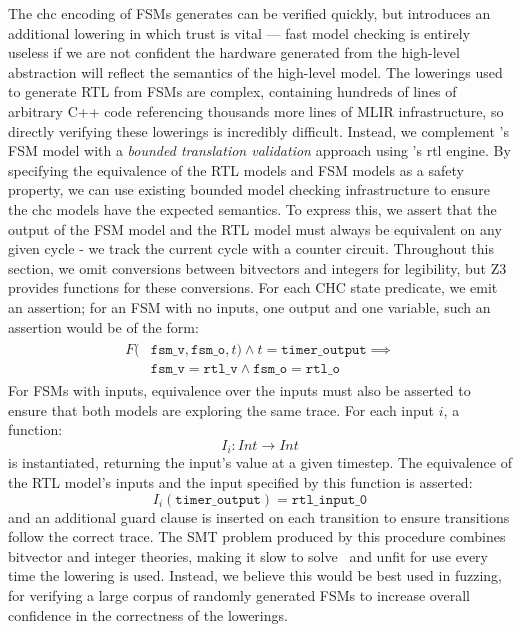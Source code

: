 \documentclass[acmsmall,screen,review]{acmart}
\begin{document}
The \ac{chc} encoding of FSMs \toolname{} generates can be verified quickly, but introduces an additional lowering in which trust is vital --- fast model checking is entirely useless if we are not confident the hardware generated from the high-level abstraction will reflect the semantics of the high-level model.
The lowerings used to generate RTL from FSMs are complex, containing hundreds of lines of arbitrary C++ code referencing thousands more lines of MLIR infrastructure, so directly verifying these lowerings is incredibly difficult.
Instead, we complement \toolname{}'s FSM model with a \textit{bounded translation validation} approach using \toolname{}'s \ac{rtl} engine.
By specifying the equivalence of the RTL models and FSM models as a safety property, we can use existing bounded model checking infrastructure to ensure the \ac{chc} models have the expected semantics.
To express this, we assert that the output of the FSM model and the RTL model must always be equivalent on any given cycle - we track the current cycle with a counter circuit.
Throughout this section, we omit conversions between bitvectors and integers for legibility, but Z3 provides functions for these conversions.
For each CHC state predicate, we emit an assertion; for an FSM with no inputs, one output and one variable, such an assertion would be of the form:
\begin{align}
\begin{split}
F(&\texttt{fsm\_v}, \texttt{fsm\_o}, t) \land t = \texttt{timer\_output} \implies \\
&\texttt{fsm\_v} = \texttt{rtl\_v} \land \texttt{fsm\_o} = \texttt{rtl\_o}
\end{split}    
\end{align}
For FSMs with inputs, equivalence over the inputs must also be asserted to ensure that both models are exploring the same trace.
For each input $i$, a function:
\begin{equation}
  I_i : Int \rightarrow Int
\end{equation}    
is instantiated, returning the input's value at a given timestep.
The equivalence of the RTL model's inputs and the input specified by this function is asserted:
\begin{equation}
  I_i(\texttt{timer\_output}) = \texttt{rtl\_input\_0} 
\end{equation}    
and an additional guard clause is inserted on each transition to ensure transitions follow the correct trace.
The SMT problem produced by this procedure combines bitvector and integer theories, making it slow to solve~\cite{xu2021mixedsmt} and unfit for use every time the lowering is used.
Instead, we believe this would be best used in fuzzing, for verifying a large corpus of randomly generated FSMs to increase overall confidence in the correctness of the lowerings.
\end{document}
